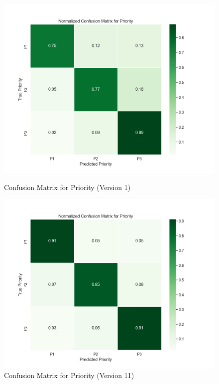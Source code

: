 \begin{figure}[t!]
    \centering
    \begin{minipage}{0.49\textwidth}
        \centering
        \includegraphics[width=\textwidth]{ch4/assets/v1_confusion_priority.png}
        \caption{Confusion Matrix for Priority (Version 1)}
        \label{fig:confusion_priority_v1}
    \end{minipage}
    \hfill
    \begin{minipage}{0.49\textwidth}
        \centering
        \includegraphics[width=\textwidth]{ch4/assets/v11_confusion_priority.png}
        \caption{Confusion Matrix for Priority (Version 11)}
        \label{fig:confusion_priority_v11}
    \end{minipage}
\end{figure}

